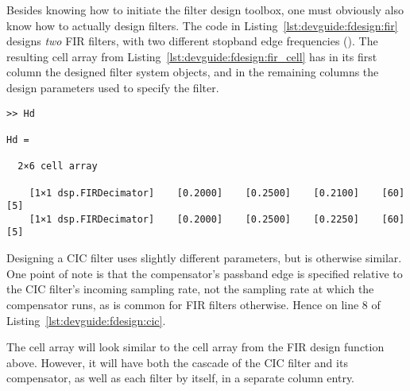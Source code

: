 Besides  knowing  how  to  initiate   the  filter  design  toolbox,  one  must
obviously  also   know  how   to  actually  design   filters.   The   code  in
Listing~\ref{lst:devguide:fdesign:fir}  designs \emph{two}  FIR filters,  with
two  different stopband  edge  frequencies ().   The resulting  cell
array   from  Listing~\ref{lst:devguide:fdesign:fir_cell} has  in its
first column the designed filter system  objects, and in the remaining columns
the design parameters used to specify the filter.

\vspace{2ex}
\vspace{2ex}
\begin{tcolorbox}[
    skin=alpenlisting,
    title={
        \refstepcounter{listing}
        \textbf{Listing \thelisting:} Cell Array with Two FIR Filters
        \label{lst:devguide:fdesign:fir_cell}
        \addcontentsline{lol}{listing}{\protect\numberline{\thelisting}Cell Array with Two FIR Filters}
    }
]
\begin{verbatim}
>> Hd

Hd =

  2×6 cell array

    [1×1 dsp.FIRDecimator]    [0.2000]    [0.2500]    [0.2100]    [60]    [5]
    [1×1 dsp.FIRDecimator]    [0.2000]    [0.2500]    [0.2250]    [60]    [5]
\end{verbatim}
\end{tcolorbox}
\vspace{2ex}

Designing  a   CIC  filter   uses  slightly   different  parameters,   but  is
otherwise  similar. One  point of  note  is  that the  compensator's  passband
edge  is  specified relative  to  the  CIC  filter's incoming  sampling  rate,
not  the  sampling rate  at  which  the compensator  runs,  as  is common  for
FIR  filters  otherwise. Hence    on  line  \num{8}  of
Listing~\ref{lst:devguide:fdesign:cic}.

The  cell array will look similar  to the cell array from the FIR
design  function above. However,  it will  have both  the cascade  of the  CIC
filter and its  compensator, as well as  each filter by itself,  in a separate
column entry.

